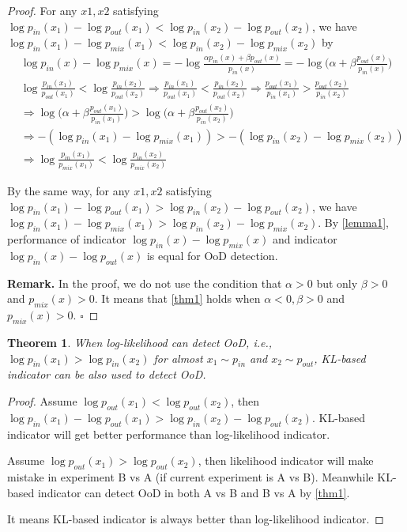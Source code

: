 \documentclass[a3paper]{article}
\newtheorem{theorem}{Theorem}
\newtheorem*{proof}{\it{Proof.}\rm}
\newcommand{\IE}{\textit{i.e.}, }
\newcommand{\pin}{p_{in}}
\newcommand{\pout}{p_{out}}
\newcommand{\pmix}{p_{mix}}
\newcommand*{\QED}{\hfill\ensuremath{\square}}  %
\begin{document}
\begin{proof}\rm
	For any $x1,x2$ satisfying $\log \pin(x_1) - \log \pout(x_1) < \log \pin(x_2) - \log \pout(x_2)$, we have $\log \pin(x_1) - \log \pmix(x_1) < \log \pin(x_2) - \log \pmix(x_2)$ by
	\begin{align*}
		&\log \pin(x) - \log \pmix(x) = -\log \frac{\alpha \pin(x) + \beta \pout(x)}{\pin(x)} = -\log 
		\Big(\alpha + \beta \frac{\pout(x)}{\pin(x)}\Big) \\
		&\log \frac{\pin(x_1)}{\pout(x_1)} < \log \frac{\pin(x_2)}{\pout(x_2)} \Rightarrow \frac{\pin(x_1)}{\pout(x_1)} < \frac{\pin(x_2)}{\pout(x_2)} \Rightarrow \frac{\pout(x_1)}{\pin(x_1)} > \frac{\pout(x_2)}{\pin(x_2)} \\
	 &\Rightarrow \log \Big(\alpha + \beta \frac{\pout(x_1)}{\pin(x_1)}\Big) > \log 
		\Big(\alpha + \beta \frac{\pout(x_2)}{\pin(x_2)}\Big) \\
		&\Rightarrow -(\log \pin(x_1) - \log \pmix(x_1)) > -(\log \pin(x_2) - \log \pmix(x_2)) \\
		&\Rightarrow \log \frac{\pin(x_1)}{\pmix(x_1)} < \log \frac{\pin(x_2)}{\pmix(x_2)} 
	\end{align*}
	
	By the same way, for any $x1,x2$ satisfying $\log \pin(x_1) - \log \pout(x_1) > \log \pin(x_2) - \log \pout(x_2)$, we have $\log \pin(x_1) - \log \pmix(x_1) > \log \pin(x_2) - \log \pmix(x_2)$.  By \cref{lemma1}, performance of indicator $\log \pin(x) - \log \pmix(x)$ and indicator $\log \pin(x) - \log \pout(x)$ is equal for OoD detection.
	
	\noindent \textbf{Remark.} In the proof, we do not use the condition that $\alpha > 0$ but only $\beta > 0$ and $\pmix(x) > 0$. It means that \cref{thm1} holds when $\alpha < 0, \beta > 0$ and $\pmix(x) > 0$. 
\QED
\end{proof}

\begin{theorem}\label{thm3}
When log-likelihood can detect OoD, \IE $\log \pin(x_1) > \log \pin(x_2)$ for almost $x_1 \sim \pin$ and $x_2 \sim \pout$, KL-based indicator can be also used to detect OoD.
\end{theorem}
\begin{proof}\rm
	Assume $\log \pout(x_1) < \log \pout(x_2)$, then $\log \pin(x_1) - \log \pout(x_1) > \log \pin(x_2) - \log \pout(x_2)$.
	KL-based indicator will get better performance than log-likelihood indicator. 
	
	Assume $\log \pout(x_1) > \log \pout(x_2)$, then likelihood indicator will make mistake in experiment B vs A (if current experiment is A vs B). Meanwhile KL-based indicator can detect OoD in both A vs B and B vs A by \cref{thm1}.  
	
	It means KL-based indicator is always better than log-likelihood indicator. 
\end{proof}
\end{document}
